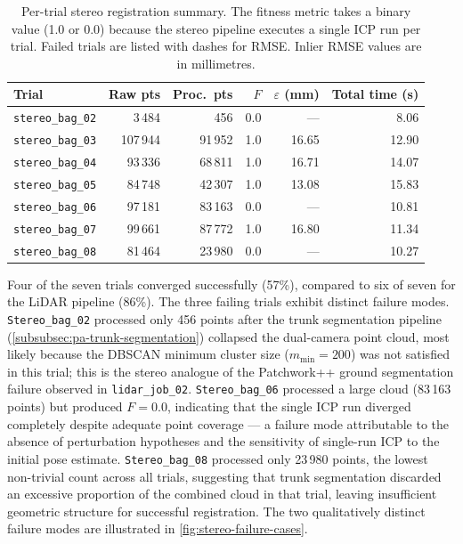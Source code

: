 \begin{table}[htbp]
  \centering
  \small
  \setlength{\tabcolsep}{4pt}
  \caption{Per-trial stereo registration summary. The fitness metric takes a binary value (1.0 or 0.0) because the stereo pipeline executes a single ICP run per trial. Failed trials are listed with dashes for RMSE. Inlier RMSE values are in millimetres.}
  \label{tab:pa-results-stereo-per-bag}
  \begin{tabular}{@{} l r r r r r @{}}
    \toprule
    \textbf{Trial} &
    \textbf{Raw pts} &
    \textbf{Proc.\ pts} &
    \boldmath$F$ &
    \boldmath$\varepsilon$ \textbf{(mm)} &
    \textbf{Total time (s)} \\
    \midrule
    \texttt{stereo\_bag\_02} &   3\,484 &    456 & 0.0 &     --- &  8.06 \\
    \texttt{stereo\_bag\_03} & 107\,944 & 91\,952 & 1.0 & 16.65 & 12.90 \\
    \texttt{stereo\_bag\_04} &  93\,336 & 68\,811 & 1.0 & 16.71 & 14.07 \\
    \texttt{stereo\_bag\_05} &  84\,748 & 42\,307 & 1.0 & 13.08 & 15.83 \\
    \texttt{stereo\_bag\_06} &  97\,181 & 83\,163 & 0.0 &     --- & 10.81 \\
    \texttt{stereo\_bag\_07} &  99\,661 & 87\,772 & 1.0 & 16.80 & 11.34 \\
    \texttt{stereo\_bag\_08} &  81\,464 & 23\,980 & 0.0 &     --- & 10.27 \\
    \bottomrule
  \end{tabular}
\end{table}

Four of the seven trials converged successfully (57\%), compared to six of seven for the LiDAR pipeline (86\%). The three failing trials exhibit distinct failure modes. \texttt{Stereo\_bag\_02} processed only 456 points after the trunk segmentation pipeline (\cref{subsubsec:pa-trunk-segmentation}) collapsed the dual-camera point cloud, most likely because the DBSCAN minimum cluster size ($m_\mathrm{min} = 200$) was not satisfied in this trial; this is the stereo analogue of the Patchwork++ ground segmentation failure observed in \texttt{lidar\_job\_02}. \texttt{Stereo\_bag\_06} processed a large cloud (83\,163 points) but produced $F = 0.0$, indicating that the single ICP run diverged completely despite adequate point coverage --- a failure mode attributable to the absence of perturbation hypotheses and the sensitivity of single-run ICP to the initial pose estimate. \texttt{Stereo\_bag\_08} processed only 23\,980 points, the lowest non-trivial count across all trials, suggesting that trunk segmentation discarded an excessive proportion of the combined cloud in that trial, leaving insufficient geometric structure for successful registration. The two qualitatively distinct failure modes are illustrated in \cref{fig:stereo-failure-cases}.


